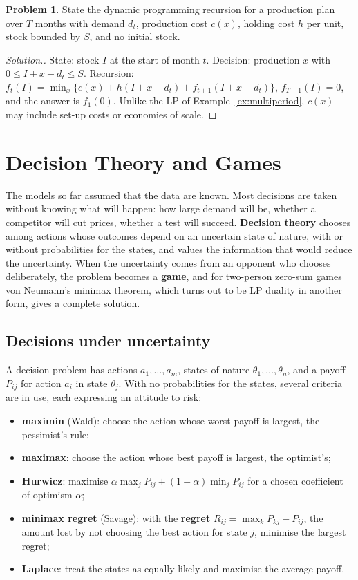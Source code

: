 \documentclass[11pt,a4paper]{article}
\numberwithin{equation}{section}
\theoremstyle{definition}
\newtheorem{problemx}{Problem}[subsection]
\newenvironment{problem}{\begin{problemx}}{\end{problemx}}
\newenvironment{solution}
  {\renewcommand{\qedsymbol}{}\begin{proof}[\textit{Solution}.]}
  {\end{proof}}
\begin{document}
\begin{problem}
State the dynamic programming recursion for a production plan over $T$ months with demand $d_t$, production cost $c(x)$, holding cost $h$ per unit, stock bounded by $S$, and no initial stock.
\end{problem}

\begin{solution}
State: stock $I$ at the start of month $t$. Decision: production $x$ with $0 \leq I + x - d_t \leq S$. Recursion: $f_t(I) = \min_x\{c(x) + h(I + x - d_t) + f_{t + 1}(I + x - d_t)\}$, $f_{T + 1}(I) = 0$, and the answer is $f_1(0)$. Unlike the LP of Example~\ref{ex:multiperiod}, $c(x)$ may include set-up costs or economies
of scale.
\end{solution}

\section{Decision Theory and Games}
\label{sec:games}

The models so far assumed that the data are known. Most decisions are taken without knowing what will happen: how large demand will be, whether a competitor will cut prices, whether a test will succeed. \textbf{Decision theory} chooses among actions whose outcomes depend on an uncertain state of nature, with or without
probabilities for the states, and values the information that would reduce the uncertainty. When the uncertainty comes from an opponent who chooses deliberately, the problem becomes a \textbf{game}, and for two-person zero-sum games von Neumann's minimax theorem, which turns out to be LP duality in another form, gives a complete solution.

\subsection{Decisions under uncertainty}
\label{ssec:uncertainty}

A decision problem has actions $a_1, \ldots, a_m$, states of nature $\theta_1, \ldots, \theta_n$, and a payoff $P_{ij}$ for action $a_i$ in state $\theta_j$. With no probabilities for the states, several criteria are in use, each expressing an attitude to risk:
\begin{itemize}
\item \textbf{maximin} (Wald): choose the action whose worst payoff is largest, the pessimist's rule;
\item \textbf{maximax}: choose the action whose best payoff is largest, the optimist's;
\item \textbf{Hurwicz}: maximise $\alpha\max_jP_{ij} + (1 - \alpha)\min_jP_{ij}$ for a chosen coefficient of optimism $\alpha$;
\item \textbf{minimax regret} (Savage): with the \textbf{regret} $R_{ij} = \max_kP_{kj} - P_{ij}$, the amount lost by not choosing the best action for state $j$, minimise the largest regret;
\item \textbf{Laplace}: treat the states as equally likely and maximise the average payoff.
\end{itemize}
\end{document}
